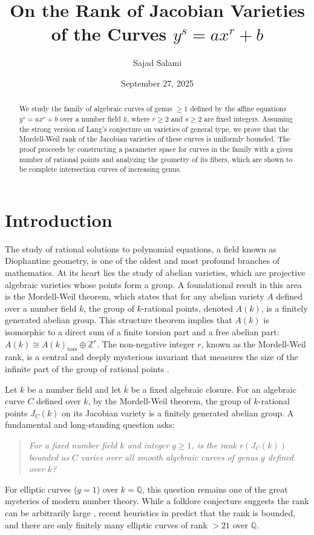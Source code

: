 \documentclass[11pt, a4paper]{amsart}
\title[Rank of Jacobians of $y^s=ax^r+b$]{On the Rank of Jacobian Varieties of the Curves $y^s=ax^r+b$}
\author{Sajad Salami}
\date{September 27, 2025}
\theoremstyle{definition}
\newcommand{\Q}{\mathbb{Q}}
\newcommand{\Z}{\mathbb{Z}}
\newcommand{\kk}{\bar{k}}
\begin{document}
	
	\begin{abstract}
		We study the family of algebraic curves of genus $\geq 1$ defined by the affine equations $y^s=ax^r+b$ over a number field $k$, where $r \geq 2$ and $s\geq 2$ are fixed integers. Assuming the strong version of Lang's conjecture on varieties of general type, we prove that the Mordell-Weil rank of the Jacobian varieties of these curves is uniformly bounded. The proof proceeds by constructing a parameter space for curves in the family with a given number of rational points and analyzing the geometry of its fibers, which are shown to be complete intersection curves of increasing genus.
	\end{abstract}
	
	\maketitle
	
	\tableofcontents
	
	\section{Introduction}

The study of rational solutions to polynomial equations, a field known as Diophantine geometry, is one of the oldest and most profound branches of mathematics. At its heart lies the study of abelian varieties, which are projective algebraic varieties whose points form a group. A foundational result in this area is the Mordell-Weil theorem, which states that for any abelian variety $A$ defined over a number field $k$, the group of $k$-rational points, denoted $A(k)$, is a finitely generated abelian group. This structure theorem implies that $A(k)$ is isomorphic to a direct sum of a finite torsion part and a free abelian part: $A(k) \cong A(k)_{\text{tors}} \oplus \mathbb{Z}^r$. The non-negative integer $r$, known as the Mordell-Weil rank, is a central and deeply mysterious invariant that measures the size of the infinite part of the group of rational points \cite{Silverman1986}.

Let $k$ be a number field and let $\kk$ be a fixed algebraic closure. For an algebraic curve $C$ defined over $k$, by the Mordell-Weil theorem, the group of $k$-rational points $J_C(k)$ on its Jacobian variety is a finitely generated abelian group. 
A fundamental and long-standing question asks:
\begin{quote}
	\textit{For a fixed number field $k$ and integer $g \geq 1$, is the rank $r(J_C(k))$ bounded as $C$ varies over all smooth algebraic curves of genus $g$ defined over $k$?}
\end{quote}
For elliptic curves ($g=1$) over $k=\Q$, this question remains one of the great mysteries of modern number theory. While a folklore conjecture suggests the rank can be arbitrarily large \cite{Silverman1986}, recent heuristics in  \cite{Park2019} predict that the rank is bounded, and there are only finitely many elliptic curves of rank $> 21$ over $\Q$.
\end{document}
